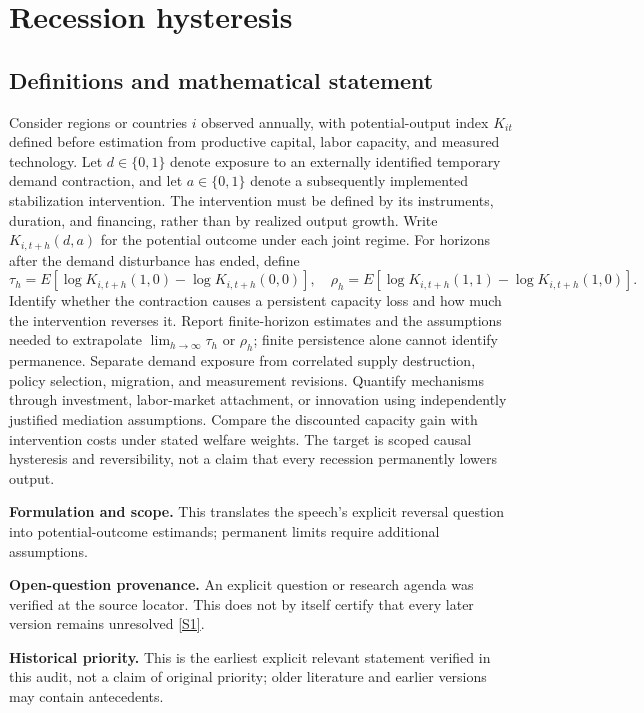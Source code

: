 \documentclass[11pt]{article}
\newcommand{\sref}[2]{\hyperlink{source:#1:#2}{[S#2]}}
\begin{document}
\section*{Recession hysteresis}\label{30007517}
\subsection{Definitions and mathematical statement}
Consider regions or countries \(i\) observed annually, with potential-output index \(K_{it}\) defined before estimation from productive capital, labor capacity, and measured technology. Let \(d\in\{0,1\}\) denote exposure to an externally identified temporary demand contraction, and let \(a\in\{0,1\}\) denote a subsequently implemented stabilization intervention. The intervention must be defined by its instruments, duration, and financing, rather than by realized output growth. Write \(K_{i,t+h}(d,a)\) for the potential outcome under each joint regime.
For horizons after the demand disturbance has ended, define
\[
\tau_h=E[\log K_{i,t+h}(1,0)-\log K_{i,t+h}(0,0)],\quad
\rho_h=E[\log K_{i,t+h}(1,1)-\log K_{i,t+h}(1,0)].
\]
Identify whether the contraction causes a persistent capacity loss and how much the intervention reverses it. Report finite-horizon estimates and the assumptions needed to extrapolate \(\lim_{h\to\infty}\tau_h\) or \(\rho_h\); finite persistence alone cannot identify permanence. Separate demand exposure from correlated supply destruction, policy selection, migration, and measurement revisions. Quantify mechanisms through investment, labor-market attachment, or innovation using independently justified mediation assumptions. Compare the discounted capacity gain with intervention costs under stated welfare weights. The target is scoped causal hysteresis and reversibility, not a claim that every recession permanently lowers output.

\par\textbf{Formulation and scope.} This translates the speech’s explicit reversal question into potential-outcome estimands; permanent limits require additional assumptions.

\par\textbf{Open-question provenance.} An explicit question or research agenda was verified at the source locator. This does not by itself certify that every later version remains unresolved \sref{30007517}{1}.

\par\textbf{Historical priority.} This is the earliest explicit relevant statement verified in this audit, not a claim of original priority; older literature and earlier versions may contain antecedents.
\end{document}
